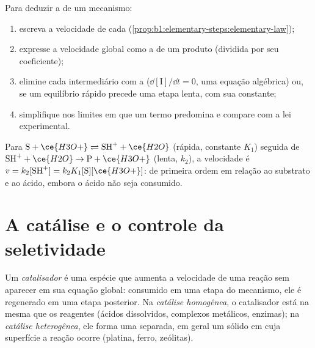 \begin{method}\label{met:b1:elementary-steps:rate-law}
Para deduzir a  de um mecanismo:
\begin{enumerate}
  \item escreva a velocidade de cada  (\cref{prop:b1:elementary-steps:elementary-law});
  \item expresse a velocidade global como a  de um
        produto (dividida por seu coeficiente);
  \item elimine cada intermediário com a  ($\dd[\mathrm{I}]/\dd t = 0$, uma equação algébrica)
        ou, se um equilíbrio rápido precede uma etapa lenta, com sua
        constante;
  \item simplifique nos limites em que um termo predomina e compare com
        a lei experimental.
\end{enumerate}
\end{method}

\begin{example}\label{ex:b1:elementary-steps:acid}
Para $\mathrm{S} + \ce{H3O+} \rightleftharpoons \mathrm{SH}^+ + \ce{H2O}$ (rápida,
constante $K_1$) seguida de $\mathrm{SH}^+ + \ce{H2O} \to \mathrm{P} + \ce{H3O+}$ (lenta,
$k_2$), a velocidade é $v = k_2[\mathrm{SH}^+] = k_2K_1[\mathrm{S}][\ce{H3O+}]$:
de primeira ordem em relação ao substrato e ao ácido, embora o ácido não
seja consumido.
\end{example}

\section{A catálise e o controle da seletividade}

\begin{definition}\label{def:b1:elementary-steps:catalyst}
Um \emph{catalisador} é uma espécie que aumenta a
velocidade de uma reação sem aparecer em sua equação global: consumido
em uma etapa do mecanismo, ele é regenerado em uma etapa posterior. Na
\emph{catálise homogênea}, o catalisador está
na mesma  que os reagentes (ácidos dissolvidos, complexos metálicos,
enzimas); na \emph{catálise heterogênea},
ele forma uma  separada, em geral um sólido em cuja superfície a
reação ocorre (platina, ferro, zeólitas).
\end{definition}

